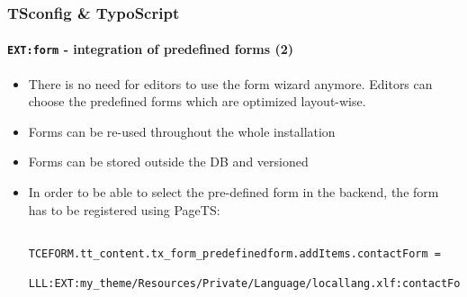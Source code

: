 \begin{frame}[fragile]
	\frametitle{TSconfig \& TypoScript}
	\framesubtitle{\texttt{EXT:form} - integration of predefined forms (2)}

	\lstset{basicstyle=\tiny\ttfamily}

	\begin{itemize}

		\item There is no need for editors to use the form wizard anymore.
			Editors can choose the predefined forms which are optimized layout-wise.

		\item Forms can be re-used throughout the whole installation

		\item Forms can be stored outside the DB and versioned

		\item In order to be able to select the pre-defined form in the backend,
			the form has to be registered using PageTS:

		\begin{lstlisting}
			TCEFORM.tt_content.tx_form_predefinedform.addItems.contactForm =
			  LLL:EXT:my_theme/Resources/Private/Language/locallang.xlf:contactForm
		\end{lstlisting}

	\end{itemize}

\end{frame}

